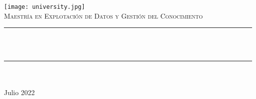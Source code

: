 \begin{titlepage}

    \newcommand{\HRule}{\rule{\linewidth}{0.5mm}}

    \center
    \texttt{[image: university.jpg]}\\[1cm]

    \textsc{\Large Maestr\'ia en Explotaci\'on de Datos y Gesti\'on del Conocimiento}\\[1.5cm]

    \makeatletter
    \HRule \\[0.6cm]
    {\huge \bfseries \@title}\\[0.4cm]
    \HRule \\[2cm]

    {\Large \@author}\\[3cm]

    {\large Julio 2022}\\[2cm]

    \vfill
\end{titlepage}